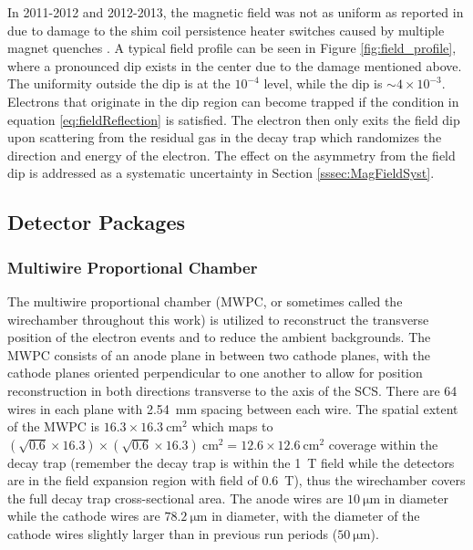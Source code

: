 In 2011-2012 and 2012-2013, the magnetic field was not as uniform as reported in 
\cite{plaster2008solenoidal} due to damage to the shim coil persistence heater switches
caused by multiple magnet quenches \cite{plaster2012}. A typical field profile can be seen
in Figure \ref{fig:field_profile}, where a pronounced dip exists in the center due to the damage
mentioned above. The uniformity outside the dip is at the $10^{-4}$ level, while the dip is
$\sim4\times 10^{-3}$. Electrons
that originate in the dip region can become trapped if the condition in equation
\ref{eq:fieldReflection} is satisfied. The electron then only exits the field dip
upon scattering from the residual gas in the decay trap which randomizes the direction
and energy
of the electron. The effect
on the asymmetry from the field
dip is addressed as a systematic
uncertainty in Section \ref{sssec:MagFieldSyst}.


\subsection{Detector Packages}

\subsubsection{Multiwire Proportional Chamber} \label{sssec:ExpMWPC}

The multiwire proportional chamber (MWPC, or sometimes called the wirechamber throughout this work)
\cite{ito2007,plaster2012} is
utilized to reconstruct the transverse position of the electron events and to reduce the ambient
backgrounds. The MWPC consists of an anode plane in between two cathode planes, with the cathode
planes oriented perpendicular to one another to allow for position reconstruction in both directions
transverse to the axis of the SCS. There are
64 wires in each plane with 2.54~mm spacing between each wire. The spatial extent of the
MWPC is $16.3 \times 16.3\mathrm{~cm}^2$ which maps to
$ (\sqrt{0.6} \times 16.3) \times (\sqrt{0.6} \times 16.3) \mathrm{~cm}^2 = 12.6 \times 12.6\mathrm{~cm}^2$ coverage
within the decay trap (remember the decay trap is within the 1~T field while the detectors
are in the field expansion region with field of 0.6~T), thus the wirechamber covers the full
decay trap cross-sectional area. The anode wires are $10\mathrm{~\mu{m}}$ in diameter while the cathode
wires are $78.2\mathrm{~\mu{m}}$ in diameter, with the diameter of the cathode wires slightly
larger than in previous run periods ($50\mathrm{~\mu{m}}$).


